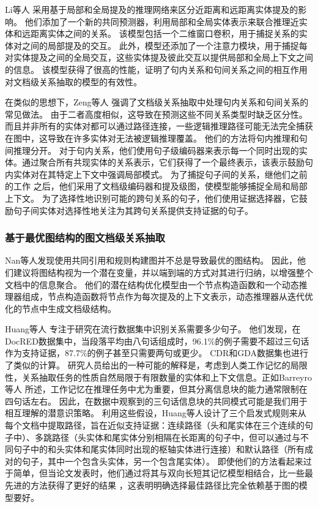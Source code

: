 \documentclass[bachelor]{thesis-uestc}
\begin{document}
Li等人 \cite{li-etal-2021-mrn} 采用基于局部和全局提及的推理网络来区分近距离和远距离实体提及的影响。
他们添加了一个新的共同预测器，利用局部和全局实体表示来联合推理近实体和远距离实体之间的关系。
该模型包括一个二维窗口卷积，用于捕捉关系的实体对之间的局部提及的交互。
此外，模型还添加了一个注意力模块，用于捕捉每对实体提及之间的全局交互，这些实体提及彼此交互以提供局部和全局上下文之间的信息。
该模型获得了很高的性能，证明了句内关系和句间关系之间的相互作用对文档级关系抽取的模型的有效性。\par

在类似的思想下，Zeng等人 \cite{zeng-etal-2021-sire} 强调了文档级关系抽取中处理句内关系和句间关系的常见做法。
由于二者高度相似，这导致在预测这些不同关系类型时缺乏区分性。
而且并非所有的实体对都可以通过路径连接，一些逻辑推理路径可能无法完全捕获在图中，这导致在许多实体对无法被逻辑推理覆盖。
他们的方法将句内推理和句间推理分开。
对于句内关系，他们使用句子级编码器来表示每一个同时出现的实体。通过聚合所有共现实体的关系表示，它们获得了一个最终表示，该表示鼓励句内实体对在其特定上下文中强调局部模式。
为了捕捉句子间的关系，继他们之前的工作 \cite{GAIN}之后，他们采用了文档级编码器和提及级图，使模型能够捕捉全局和局部上下文。
为了选择性地识别可能的跨句关系的句子，他们使用证据选择器，它鼓励句子间实体对选择性地关注为其跨句关系提供支持证据的句子。\par

\subsubsection{基于最优图结构的图文档级关系抽取}\label{subsec:optimal-graph}

Nan等人\cite{nan-etal-2020-reasoning}发现使用共同引用和规则构建图并不总是导致最优的图结构。
因此，他们建议将图结构视为一个潜在变量，并以端到端的方式对其进行归纳，以增强整个文档中的信息聚合。
他们的潜在结构优化模型由一个节点构造函数和一个动态推理器组成，节点构造函数将节点作为每次提及的上下文表示，动态推理器从迭代优化的节点中生成文档级结构。\par

Huang等人 \cite{huang-etal-2021-three}专注于研究在流行数据集中识别关系需要多少句子。
他们发现，在DocRED数据集中，当段落平均由八句话组成时，96.1\%的例子需要不超过三句话作为支持证据，87.7\%的例子甚至只需要两句或更少。
CDR和GDA数据集也进行了类似的计算。
研究人员给出的一种可能的解释是，考虑到人类工作记忆的局限性，关系抽取任务的性质自然局限于有限数量的实体和上下文信息。正如Barreyro等人 \cite{barreyro2012working} 所述，工作记忆在推理任务中尤为重要，但其分离信息块的能力通常限制在四句话左右。
因此，在数据中观察到的三句话信息块的共同模式可能是我们用于相互理解的潜意识策略。
利用这些假设，Huang等人设计了三个启发式规则来从每个文档中提取路径，旨在近似支持证据：连续路径（头和尾实体在三个连续的句子中）、多跳路径（头实体和尾实体分别相隔在长距离的句子中，但可以通过与不同句子中的和头实体和尾实体同时出现的枢轴实体进行连接）和默认路径（所有成对的句子，其中一个包含头实体，另一个包含尾实体）。
即使他们的方法看起来过于简单，但当论文发表时，他们通过将其与双向长短其记忆模型相结合，比一些最先进的方法获得了更好的结果 \cite{nan-etal-2020-reasoning,GAIN}，这表明明确选择最佳路径比完全依赖基于图的模型要好。\par
\end{document}
